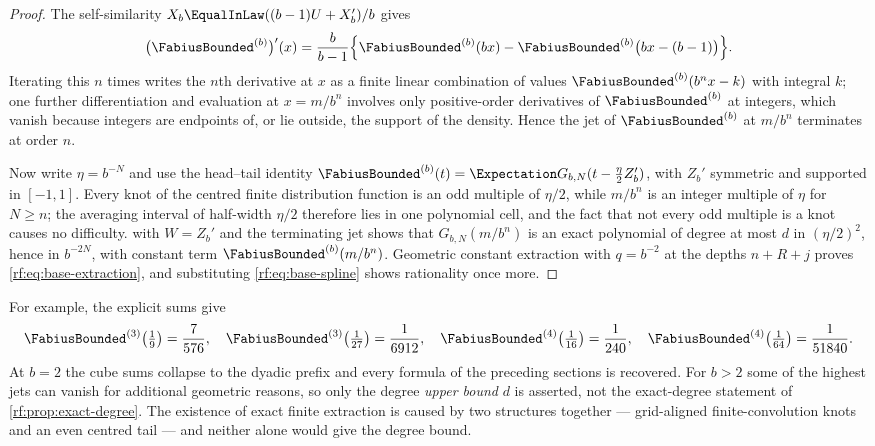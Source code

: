 \documentclass[11pt,oneside]{article}
\theoremstyle{plain}
\theoremstyle{definition}
\theoremstyle{remark}
\newcommand{\Fb}{\FabiusBounded}            %
\newcommand{\E}{\Expectation}
\begin{document}
\begin{proof}
The self-similarity $X_{b}\EqualInLaw((b-1)U+X_{b}')/b$ gives
\begin{equation}
 \bigl(\Fb^{(b)}\bigr)'(x)=\frac{b}{b-1}\Bigl\{\Fb^{(b)}(bx)-\Fb^{(b)}\bigl(bx-(b-1)\bigr)\Bigr\}.
 \label{rf:eq:base-dilation}
\end{equation}
Iterating this $n$ times writes the $n$th derivative at $x$ as a finite
linear combination of values $\Fb^{(b)}(b^{n}x-k)$ with integral $k$; one
further differentiation and evaluation at $x=m/b^{n}$ involves only
positive-order derivatives of $\Fb^{(b)}$ at integers, which vanish because
integers are endpoints of, or lie outside, the support of the density.
Hence the jet of $\Fb^{(b)}$ at $m/b^{n}$ terminates at order $n$.

Now write $\eta=b^{-N}$ and use the head--tail identity
$\Fb^{(b)}(t)=\E G_{b,N}(t-\tfrac{\eta}{2}Z_{b}')$, with $Z_{b}'$ symmetric
and supported in $[-1,1]$.  Every knot of the centred finite distribution
function is an odd multiple of $\eta/2$, while $m/b^{n}$ is an integer
multiple of $\eta$ for $N\ge n$; the averaging interval of half-width
$\eta/2$ therefore lies in one polynomial cell, and the fact that not every
odd multiple is a knot causes no difficulty.
 with $W=Z_{b}'$ and the terminating jet
shows that $G_{b,N}(m/b^{n})$ is an exact polynomial of degree at most $d$
in $(\eta/2)^{2}$, hence in $b^{-2N}$, with constant term
$\Fb^{(b)}(m/b^{n})$.  Geometric constant extraction with $q=b^{-2}$ at
the depths $n+R+j$ proves \cref{rf:eq:base-extraction}, and substituting
\cref{rf:eq:base-spline} shows rationality once more.
\end{proof}

For example, the explicit sums give
\[
 \Fb^{(3)}\!\left(\tfrac19\right)=\frac{7}{576},\quad
 \Fb^{(3)}\!\left(\tfrac1{27}\right)=\frac{1}{6912},\quad
 \Fb^{(4)}\!\left(\tfrac1{16}\right)=\frac{1}{240},\quad
 \Fb^{(4)}\!\left(\tfrac1{64}\right)=\frac{1}{51840}.
\]
At $b=2$ the cube sums collapse to the dyadic prefix and every formula of
the preceding sections is recovered.  For $b>2$ some of the highest jets can
vanish for additional geometric reasons, so only the degree \emph{upper
bound} $d$ is asserted, not the exact-degree statement of
\cref{rf:prop:exact-degree}.  The existence of exact finite extraction is
caused by two structures together --- grid-aligned finite-convolution knots
and an even centred tail --- and neither alone would give the degree bound.
\end{document}
